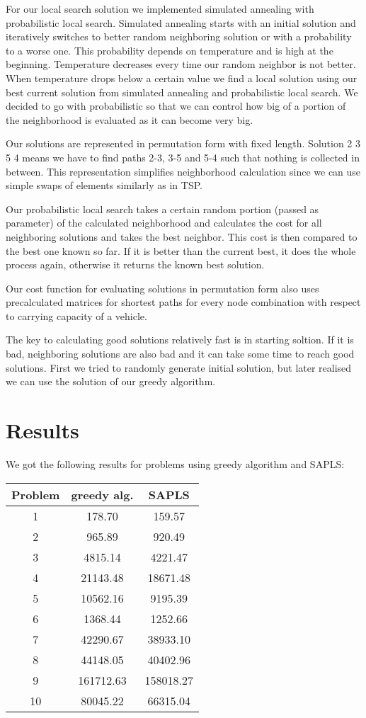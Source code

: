 \documentclass[a4paper, 12pt]{article}
\begin{document}
For our local search solution we implemented simulated annealing with 
probabilistic local search.
Simulated annealing starts with an initial solution and iteratively switches to
better random neighboring solution or with a probability to a worse one. This
probability depends on temperature and is high at the beginning. Temperature
decreases every time our random neighbor is not better. When temperature drops
below a certain value we find a local solution using 
our best current solution from simulated annealing and probabilistic local search.
We decided to go with probabilistic so that we can control
how big of  a portion of the neighborhood is evaluated as it can become very big.

Our solutions are represented in permutation form with fixed length. Solution
2 3 5 4 means we have to find paths 2-3, 3-5 and 5-4 such that nothing is
collected in between. This representation simplifies neighborhood calculation
since we can use simple swaps of elements similarly as in TSP.

Our probabilistic local search takes a certain random portion (passed as parameter)
of the calculated neighborhood and calculates the cost for all neighboring solutions 
and takes the best neighbor. This cost is then compared to the best one known 
so far. If it is better than the current best, it does the whole process again, 
otherwise it returns the known best solution.

Our cost function for evaluating solutions in permutation form also uses
precalculated matrices for shortest paths for every node combination with
respect to carrying capacity of a vehicle.

The key to calculating good solutions relatively fast is in starting soltion.
If it is bad, neighboring solutions are also bad and it can take some time to
reach good solutions. First we tried to randomly generate initial solution, but
later realised we can use the solution of our greedy algorithm.

\newpage

\section{Results}

We got the following results for problems using greedy algorithm and SAPLS:
\begin{center}
\begin{tabular}{ c|cc }
	Problem & greedy alg. & SAPLS \\
	\hline
	1 & 178.70 & 159.57 \\
	2 & 965.89 & 920.49 \\
	3 & 4815.14 & 4221.47 \\
	4 & 21143.48 & 18671.48 \\
	5 & 10562.16 & 9195.39 \\
	6 & 1368.44 & 1252.66 \\
	7 & 42290.67 & 38933.10 \\
	8 & 44148.05 & 40402.96 \\
	9 & 161712.63 & 158018.27 \\
	10 & 80045.22 & 66315.04 \\
\end{tabular}
\end{center}
\end{document}
